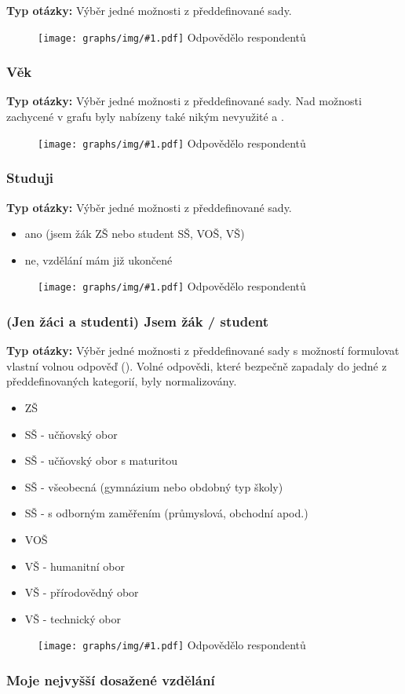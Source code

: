 \documentclass[12pt, a4paper, twoside]{article}
\newcommand{\answercount}[1]{Odpovědělo  respondentů}
\newcommand{\includegraph}[2]{
  \begin{figure}[H]
    \centering
    \textbf{#2}
    \texttt{[image: graphs/img/\#1.pdf]}
    \answercount{#1}
  \end{figure}
}
\newcommand{\qtype}{\textbf{Typ otázky:}
}
\newcommand{\pickOne}{Výběr jedné možnosti z předdefinované sady\xspace}
\newcommand{\withOther}{s možností formulovat vlastní volnou odpověď (\uv{Jiné})\xspace}
\begin{document}
\qtype \pickOne.

\includegraph{jsem}{}

\subsubsection{Věk}\label{sec:vek}

\qtype \pickOne.
Nad možnosti zachycené v grafu byly nabízeny také nikým nevyužité
 a .

\includegraph{vek}{}

\subsubsection{Studuji}

\qtype \pickOne.

\begin{itemize}
\item ano (jsem žák ZŠ nebo student SŠ, VOŠ, VŠ)
\item ne, vzdělání mám již ukončené
\end{itemize}

\includegraph{studuji}{}

\subsubsection{(Jen žáci a studenti) Jsem žák / student}

\qtype \pickOne \withOther.
Volné odpovědi, které bezpečně zapadaly do jedné z předdefinovaných
kategorií, byly normalizovány.

\begin{itemize}
\item ZŠ
\item SŠ - učňovský obor
\item SŠ - učňovský obor s maturitou
\item SŠ - všeobecná (gymnázium nebo obdobný typ školy)
\item SŠ - s odborným zaměřením (průmyslová, obchodní apod.)
\item VOŠ
\item VŠ - humanitní obor
\item VŠ - přírodovědný obor
\item VŠ - technický obor
\end{itemize}

\includegraph{studuji_co}{}

\subsubsection{Moje nejvyšší dosažené vzdělání}
\end{document}
